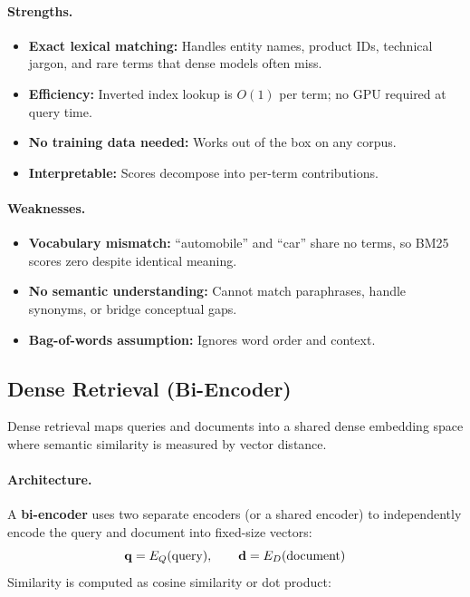 \paragraph{Strengths.}
\begin{itemize}
    \item \textbf{Exact lexical matching:} Handles entity names, product IDs,
          technical jargon, and rare terms that dense models often miss.
    \item \textbf{Efficiency:} Inverted index lookup is $O(1)$ per term; no
          GPU required at query time.
    \item \textbf{No training data needed:} Works out of the box on any corpus.
    \item \textbf{Interpretable:} Scores decompose into per-term contributions.
\end{itemize}

\paragraph{Weaknesses.}
\begin{itemize}
    \item \textbf{Vocabulary mismatch:} ``automobile'' and ``car'' share no
          terms, so BM25 scores zero despite identical meaning.
    \item \textbf{No semantic understanding:} Cannot match paraphrases, handle
          synonyms, or bridge conceptual gaps.
    \item \textbf{Bag-of-words assumption:} Ignores word order and context.
\end{itemize}

\subsection{Dense Retrieval (Bi-Encoder)}
\label{sec:dense-retrieval}

Dense retrieval maps queries and documents into a shared dense embedding space
where semantic similarity is measured by vector distance.

\paragraph{Architecture.}
A \textbf{bi-encoder} uses two separate encoders (or a shared encoder) to
independently encode the query and document into fixed-size vectors:
\[
    \mathbf{q} = E_Q(\text{query}), \qquad \mathbf{d} = E_D(\text{document})
\]
Similarity is computed as cosine similarity or dot product:

